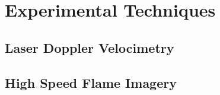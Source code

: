 \section{Experimental Techniques}
\subsection{Laser Doppler Velocimetry}\label{ldv}


\subsection{High Speed Flame Imagery}
